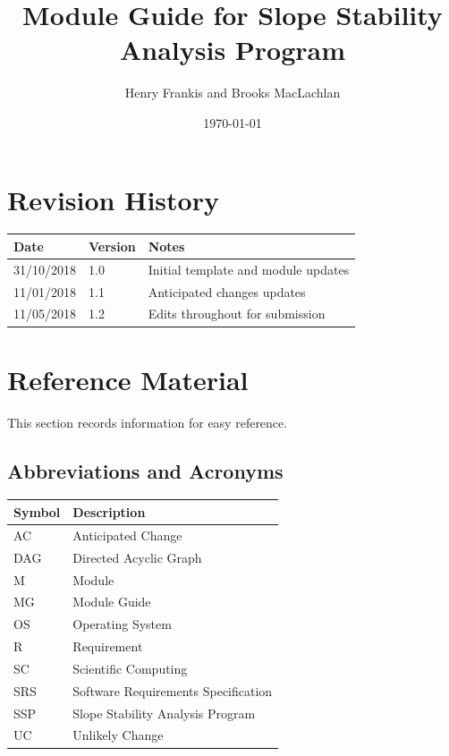 \documentclass[12pt, titlepage]{article}
\newcommand{\progname}{SSP}
\begin{document}
\title{Module Guide for Slope Stability Analysis Program} 
\author{Henry Frankis and Brooks MacLachlan}
\date{\today}

\maketitle


\section{Revision History}

\begin{tabularx}{\textwidth}{p{3cm}p{2cm}X}
	\toprule {\bf Date} & {\bf Version} & {\bf Notes}\\
	\midrule
	31/10/2018 & 1.0 & Initial template and module updates\\
	11/01/2018 & 1.1 & Anticipated changes updates\\
	11/05/2018 & 1.2 & Edits throughout for submission\\
	\bottomrule
\end{tabularx}

\newpage

\section{Reference Material}
This section records information for easy reference.
\subsection{Abbreviations and Acronyms}

\renewcommand{\arraystretch}{1.2}
\begin{tabular}{l l} 
	\toprule		
	\textbf{Symbol} & \textbf{Description}\\
	\midrule 
	AC & Anticipated Change\\
	DAG & Directed Acyclic Graph \\
	M & Module \\
	MG & Module Guide \\
	OS & Operating System \\
	R & Requirement\\
	SC & Scientific Computing \\
	SRS & Software Requirements Specification\\
	\progname & Slope Stability Analysis Program\\
	UC & Unlikely Change \\
	\bottomrule
\end{tabular}\\
\end{document}
